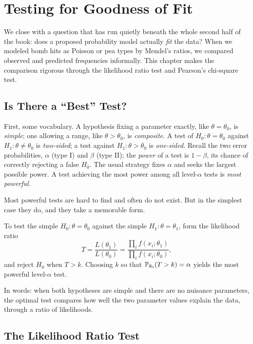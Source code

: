 \chapter{Testing for Goodness of Fit}
\label{ch:gof}

We close with a question that has run quietly beneath the whole second half of
the book: does a proposed probability model actually \emph{fit} the data? When we
modeled bomb hits as Poisson or pea types by Mendel's ratios, we compared
observed and predicted frequencies informally. This chapter makes the comparison
rigorous through the likelihood ratio test and Pearson's chi-square test.

\section{Is There a ``Best'' Test?}

First, some vocabulary. A hypothesis fixing a parameter exactly, like
$\theta=\theta_0$, is \emph{simple}; one allowing a range, like $\theta>\theta_0$,
is \emph{composite}. A test of $H_0:\theta=\theta_0$ against $H_1:\theta\neq\theta_0$
is \emph{two-sided}; a test against $H_1:\theta>\theta_0$ is \emph{one-sided}.
Recall the two error probabilities, $\alpha$ (type I) and $\beta$ (type II); the
\emph{power} of a test is $1-\beta$, its chance of correctly rejecting a false
$H_0$. The usual strategy fixes $\alpha$ and seeks the largest possible power. A
test achieving the most power among all level-$\alpha$ tests is \emph{most
powerful}.

Most powerful tests are hard to find and often do not exist. But in the simplest
case they do, and they take a memorable form.

\begin{theorem}
To test the simple $H_0:\theta=\theta_0$ against the simple $H_1:\theta=\theta_1$,
form the likelihood ratio
\[
  T=\frac{L(\theta_1)}{L(\theta_0)}=\frac{\prod_i f(x_i;\theta_1)}{\prod_i f(x_i;\theta_0)},
\]
and reject $H_0$ when $T>k$. Choosing $k$ so that $\mathbb{P}_{\theta_0}(T>k)=\alpha$
yields the most powerful level-$\alpha$ test.
\end{theorem}

In words: when both hypotheses are simple and there are no nuisance parameters,
the optimal test compares how well the two parameter values explain the data,
through a ratio of likelihoods.

\section{The Likelihood Ratio Test}

